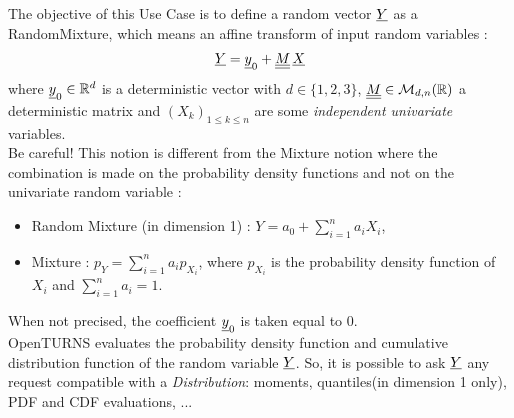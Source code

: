 \renewcommand{\filename}{docUC_OVI_RandomMixture.tex}
\renewcommand{\filetitle}{UC : Creation of a Random Mixture}

\HeaderIIILevel



The objective of this Use Case is to define a random vector ${\underline{Y}}$ as a RandomMixture, which means an affine transform of input random variables :
\begin{align*}
  \displaystyle {\underline{Y}}={\underline{y}}_0+{\underline{\underline{M}}}\,{\underline{X}}
\end{align*}
where ${\underline{y}}_0\in\mathbb{R}^d$ is a deterministic vector with $d\in\{1,2,3\}$, ${\underline{\underline{M}}}\in\mathcal{M}_{d,n}(\mathbb{R})$ a deterministic matrix and $(X_k)_{ 1 \leq k \leq n}$ are some \emph{independent univariate} variables.\\

Be careful! This notion is different from the Mixture notion where the combination is made on the probability density functions and not on the univariate random variable :
\begin{itemize}
\item Random Mixture (in dimension 1) : $Y = a_0 + \sum_{i=1}^n a_i X_i$,
\item Mixture : $p_Y = \sum_{i=1}^n a_i p_{X_i}$, where $p_{X_i}$ is the probability density function of $X_i$ and $\sum_{i=1}^n a_i = 1$.
\end{itemize}

When not precised, the coefficient ${\underline{y}}_0$ is taken equal to $0$.\\



OpenTURNS evaluates the probability density function and cumulative distribution function of the random variable ${\underline{Y}}$. So, it is possible to ask ${\underline{Y}}$ any request compatible with a {\itshape Distribution}: moments, quantiles(in dimension 1 only), PDF and CDF evaluations, ...\\

